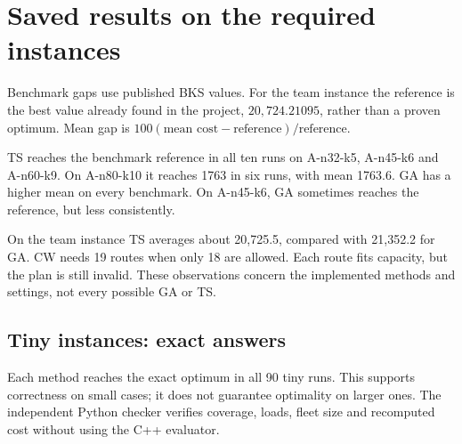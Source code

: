 \section{Saved results on the required instances}
Benchmark gaps use published BKS values. For the team instance the reference is the best value
already found in the project, $20{,}724.21095$, rather than a proven optimum.
Mean gap is $100(\text{mean cost}-\text{reference})/\text{reference}$.

\begin{table}[h]\centering\small\setlength{\tabcolsep}{4pt}

\caption{GA and TS each have ten runs. SD is sample standard deviation. Time is mean total
runtime, not time to best. CW runs once, so mean and SD are omitted. Fleet-infeasible CW costs
are diagnostic and receive no gap.}
\end{table}

TS reaches the benchmark reference in all ten runs on A-n32-k5, A-n45-k6 and A-n60-k9. On
A-n80-k10 it reaches 1763 in six runs, with mean 1763.6. GA has a higher mean on every benchmark.
On A-n45-k6, GA sometimes reaches the reference, but less consistently.

On the team instance TS averages about 20,725.5, compared with 21,352.2 for GA. CW needs 19
routes when only 18 are allowed. Each route fits capacity, but the plan is still invalid.
These observations concern the implemented methods and settings, not every possible GA or TS.

\subsection*{Tiny instances: exact answers}
\begin{table}[h]\centering\small

\caption{Stored exact costs and one-second runs reaching each optimum.
Cached dynamic-programming and MILP exact values agree.}
\end{table}

Each method reaches the exact optimum in all 90 tiny runs. This supports correctness on small
cases; it does not guarantee optimality on larger ones. The independent Python checker verifies
coverage, loads, fleet size and recomputed cost without using the C++ evaluator.
